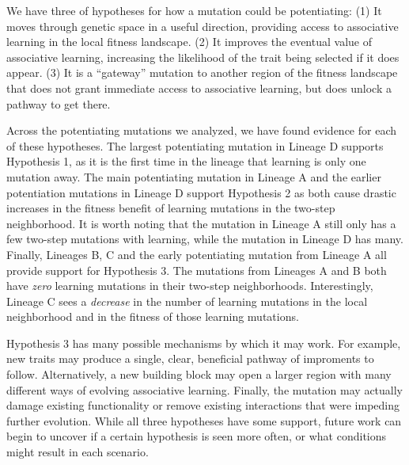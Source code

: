 We have three of hypotheses for how a mutation could be potentiating:
(1) It moves through genetic space in a useful direction, providing access to associative learning in the local fitness landscape. %
(2) It improves the eventual value of associative learning, increasing the likelihood of the trait being selected if it does appear. %
(3) It is a ``gateway'' mutation to another region of the fitness landscape that does not grant immediate access to associative learning, but does unlock a pathway to get there.

Across the potentiating mutations we analyzed, we have found evidence for each of these hypotheses.
The largest potentiating mutation in Lineage D supports Hypothesis 1, as it is the first time in the lineage that learning is only one mutation away. 
The main potentiating mutation in Lineage A and the earlier potentiation mutations in Lineage D support Hypothesis 2 as both cause drastic increases in the fitness benefit of learning mutations in the two-step neighborhood. 
It is worth noting that the mutation in Lineage A still only has a few two-step mutations with learning, while the mutation in Lineage D has many. 
Finally, Lineages B, C and the early potentiating mutation from Lineage A all provide support for Hypothesis 3. 
The mutations from Lineages A and B both have \textit{zero} learning mutations in their two-step neighborhoods. 
Interestingly, Lineage C sees a \textit{decrease} in the number of learning mutations in the local neighborhood and in the fitness of those learning mutations. 

Hypothesis 3 has many possible mechanisms by which it may work.  For example, new traits may produce a single, clear, beneficial pathway of improments to follow.  
Alternatively, a new building block may open a larger region with many different ways of evolving associative learning.
Finally, the mutation may actually damage existing functionality or remove existing interactions that were impeding further evolution.
While all three hypotheses have some support, future work can begin to uncover if a certain hypothesis is seen more often, or what conditions might result in each scenario. 

